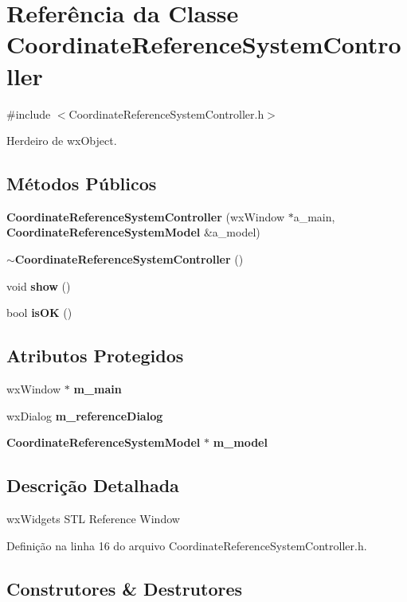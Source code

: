 \section{Referência da Classe Coordinate\+Reference\+System\+Controller}
\label{class_coordinate_reference_system_controller}


{\ttfamily \#include $<$Coordinate\+Reference\+System\+Controller.\+h$>$}



Herdeiro de wx\+Object.

\subsection*{Métodos Públicos}
\begin{DoxyCompactItemize}
\item 
{\bf Coordinate\+Reference\+System\+Controller} (wx\+Window $\ast$a\+\_\+main, {\bf Coordinate\+Reference\+System\+Model} \&a\+\_\+model)
\item 
{\bf $\sim$\+Coordinate\+Reference\+System\+Controller} ()
\item 
void {\bf show} ()
\item 
bool {\bf is\+OK} ()
\end{DoxyCompactItemize}
\subsection*{Atributos Protegidos}
\begin{DoxyCompactItemize}
\item 
wx\+Window $\ast$ {\bf m\+\_\+main}
\item 
wx\+Dialog {\bf m\+\_\+reference\+Dialog}
\item 
{\bf Coordinate\+Reference\+System\+Model} $\ast$ {\bf m\+\_\+model}
\end{DoxyCompactItemize}


\subsection{Descrição Detalhada}
wx\+Widgets S\+TL Reference Window 

Definição na linha 16 do arquivo Coordinate\+Reference\+System\+Controller.\+h.



\subsection{Construtores \& Destrutores}

